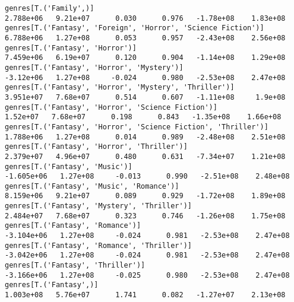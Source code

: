 \documentclass[11pt]{article}
\begin{document}
\begin{Verbatim}[commandchars=\\\{\}]
genres[T.('Family',)]                                                                                         2.788e+06   9.21e+07      0.030      0.976   -1.78e+08    1.83e+08
genres[T.('Fantasy', 'Foreign', 'Horror', 'Science Fiction')]                                                 6.788e+06   1.27e+08      0.053      0.957   -2.43e+08    2.56e+08
genres[T.('Fantasy', 'Horror')]                                                                               7.459e+06   6.19e+07      0.120      0.904   -1.14e+08    1.29e+08
genres[T.('Fantasy', 'Horror', 'Mystery')]                                                                    -3.12e+06   1.27e+08     -0.024      0.980   -2.53e+08    2.47e+08
genres[T.('Fantasy', 'Horror', 'Mystery', 'Thriller')]                                                        3.951e+07   7.68e+07      0.514      0.607   -1.11e+08     1.9e+08
genres[T.('Fantasy', 'Horror', 'Science Fiction')]                                                             1.52e+07   7.68e+07      0.198      0.843   -1.35e+08    1.66e+08
genres[T.('Fantasy', 'Horror', 'Science Fiction', 'Thriller')]                                                1.788e+06   1.27e+08      0.014      0.989   -2.48e+08    2.51e+08
genres[T.('Fantasy', 'Horror', 'Thriller')]                                                                   2.379e+07   4.96e+07      0.480      0.631   -7.34e+07    1.21e+08
genres[T.('Fantasy', 'Music')]                                                                               -1.605e+06   1.27e+08     -0.013      0.990   -2.51e+08    2.48e+08
genres[T.('Fantasy', 'Music', 'Romance')]                                                                     8.159e+06   9.21e+07      0.089      0.929   -1.72e+08    1.89e+08
genres[T.('Fantasy', 'Mystery', 'Thriller')]                                                                  2.484e+07   7.68e+07      0.323      0.746   -1.26e+08    1.75e+08
genres[T.('Fantasy', 'Romance')]                                                                             -3.104e+06   1.27e+08     -0.024      0.981   -2.53e+08    2.47e+08
genres[T.('Fantasy', 'Romance', 'Thriller')]                                                                 -3.042e+06   1.27e+08     -0.024      0.981   -2.53e+08    2.47e+08
genres[T.('Fantasy', 'Thriller')]                                                                            -3.166e+06   1.27e+08     -0.025      0.980   -2.53e+08    2.47e+08
genres[T.('Fantasy',)]                                                                                        1.003e+08   5.76e+07      1.741      0.082   -1.27e+07    2.13e+08

\end{Verbatim}
\end{document}
